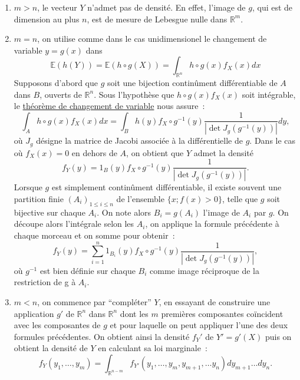 \begin{enumerate}
\def\labelenumi{\arabic{enumi}.}
\tightlist
\item
  \(m > n\), le vecteur \(Y\) n'admet pas de densité. En effet, l'image de \(g\), qui est de dimension au plus \(n\), est de mesure de Lebesgue nulle dans \(\mathbb{R}^m\). 
\item
  \(m=n\), on utilise comme dans le cas unidimensionel le changement de
  variable \(y = g(x)\) dans
  \[ \mathbb{E}(h(Y)) = \mathbb{E}(h \circ g (X)) = \int_{\mathbb{R}^n} h \circ g(x) f_X(x) dx \]
  Supposons d'abord que \(g\) soit une bijection continûment
  différentiable de \(A\) dans \(B\), ouverts de \(\mathbb{R}^n\). Sous
  l'hypothèse que \(h \circ g(x) f_X(x)\) soit intégrable, le
  \href{Calcul\%20Intégral\%20III.pdf}{théorème de changement de
  variable} nous assure~:
  \[ \int_A h\circ g (x) f_X(x) dx = \int_B h(y) f_X \circ g^{-1}(y) \frac{1}{|\det J_g (g^{-1}(y))|} dy,\]
  où \(J_g\) désigne la matrice de Jacobi associée à la différentielle
  de \(g\). Dans le cas où \(f_X(x) = 0\) en dehors de \(A\), on obtient
  que \(Y\) admet la densité
  \[ f_Y(y) = 1_B(y)f_X \circ g^{-1}(y)\frac{1}{|\det J_g (g^{-1}(y))|}.\]
  Lorsque \(g\) est simplement continûment différentiable, il existe
  souvent une partition finie \((A_i)_{1\leq i \leq n}\) de l'ensemble
  \(\{x ; f(x) >0\}\), telle que \(g\) soit bijective sur chaque
  \(A_i\). On note alors \(B_i = g(A_i)\) l'image de \(A_i\) par \(g\).
  On découpe alors l'intégrale selon les \(A_i\), on applique la formule
  précédente à chaque morceau et on somme pour obtenir~:
  \[ f_Y(y) = \sum_{i=1}^n 1_{B_i}(y)f_X \circ g^{-1}(y) \frac{1}{|\det J_g (g^{-1}(y))|},\]
  où \(g^{-1}\) est bien définie sur chaque \(B_i\) comme image
  réciproque de la restriction de g à \(A_i\).
\item
  \(m < n\), on commence par ``compléter'' \(Y\), en essayant de
  construire une application \(g'\) de \(\mathbb{R}^n\) dans
  \(\mathbb{R}^n\) dont les \(m\) premières composantes coïncident avec
  les composantes de \(g\) et pour laquelle on peut appliquer l'une des
  deux formules précédentes. On obtient ainsi la densité \(f_Y'\) de
  \(Y' = g'(X)\) puis on obtient la densité de \(Y\) en calculant sa loi
  marginale~:
  \[f_Y(y_1,\ldots,y_m) = \int_{\mathbb{R}^{n-m}} f_{Y'}(y_1,\ldots,y_m,y_{m+1},\ldots y_n) dy_{m+1}\ldots dy_n.\]
\end{enumerate}

